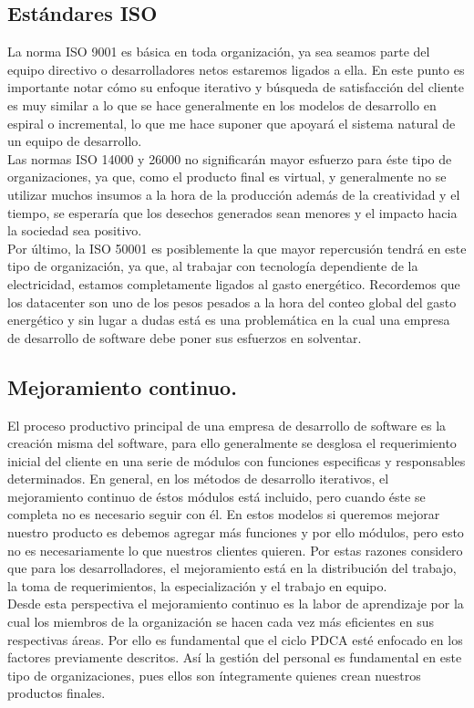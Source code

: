 \documentclass[spanish, fleqn]{article}
\begin{document}
	\subsection{Estándares ISO}
	La norma ISO 9001 es básica en toda organización, ya sea seamos parte del
	equipo directivo o desarrolladores netos estaremos ligados a ella. En este
	punto es importante notar cómo su enfoque iterativo y búsqueda de 
	satisfacción del cliente es muy similar a lo que se hace generalmente en 
	los modelos de desarrollo en espiral o incremental, lo que me hace suponer
	que apoyará el sistema natural de un equipo de desarrollo.\\
	Las normas ISO 14000 y 26000 no significarán mayor esfuerzo para éste tipo
	de organizaciones, ya que, como el producto final es virtual, y 
	generalmente no se utilizar muchos insumos a la hora de la producción además
	de la creatividad y el tiempo, se esperaría que los desechos generados sean
	menores y el impacto hacia la sociedad sea positivo.\\
	Por último, la ISO 50001 es posiblemente la que mayor repercusión tendrá en
	este tipo de organización, ya que, al trabajar con tecnología dependiente de
	la electricidad, estamos completamente ligados al gasto energético. 
	Recordemos que los datacenter son uno de los pesos pesados a la hora del 
	conteo global del gasto energético\cite{energ} y sin lugar a dudas está es
	una problemática en la cual una empresa de desarrollo de software debe 
	poner sus esfuerzos en solventar.

	\subsection{Mejoramiento continuo.}
	El proceso productivo principal de una empresa de desarrollo de software es
	la creación misma del software, para ello generalmente se desglosa el
	requerimiento inicial del cliente en una serie de módulos con funciones 
	especificas y responsables determinados. En general, en los métodos de 
	desarrollo iterativos, el mejoramiento continuo de éstos módulos está 
	incluido, pero cuando éste se completa no es necesario seguir con él. En
	estos modelos si queremos mejorar nuestro producto es debemos agregar más
	funciones y por ello módulos, pero esto no es necesariamente
	lo que nuestros clientes quieren. Por estas razones considero que para
	los desarrolladores, el mejoramiento está en la distribución del trabajo, 
	la toma de requerimientos, la especialización y el trabajo en equipo.\\
	Desde esta perspectiva el mejoramiento continuo es la labor de aprendizaje
	por la cual los miembros de la organización se hacen cada vez más eficientes
	en sus respectivas áreas. Por ello es fundamental que el ciclo PDCA esté
	enfocado en los factores previamente descritos. Así la gestión del personal
	es fundamental en este tipo de organizaciones, pues ellos son íntegramente
	quienes crean nuestros productos finales.
\end{document}
